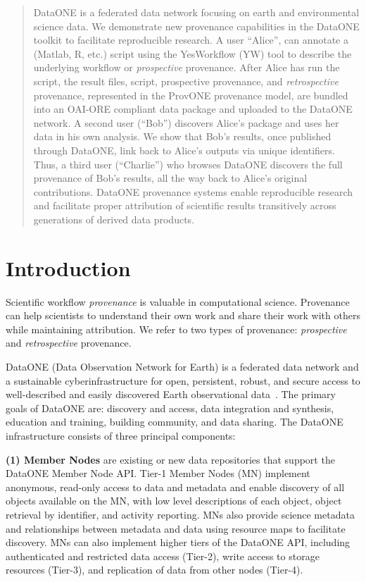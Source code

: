 \documentclass[a4paper]{llncs}
\newcommand{\mypara}[1]{\vspace{4pt}\noindent\textbf{#1}}
\begin{document}
\begin{abstract}
  DataONE is a federated data network focusing on earth and environmental science data.  We demonstrate new provenance capabilities in the DataONE toolkit to facilitate reproducible research. A user ``Alice'', can annotate a (Matlab, R, etc.) script using the YesWorkflow (YW) tool to describe the underlying workflow or \emph{prospective} provenance. After Alice has run the script, the result files, script, prospective provenance, and \emph{retrospective} provenance, represented in the ProvONE provenance model, are bundled into an OAI-ORE compliant data package and uploaded to the DataONE network. A second user (``Bob'') discovers Alice's package and uses her data in his own analysis. We show that Bob's results, once published through DataONE, link back to Alice's outputs via unique identifiers. Thus, a third user (``Charlie'') who browses DataONE discovers the full provenance of Bob's results, all the way back to Alice's original contributions.  DataONE provenance systems enable reproducible research and facilitate proper attribution of scientific results transitively across generations of derived data products.  \end{abstract}




\section{Introduction}

Scientific workflow \emph{provenance} is valuable in computational science. Provenance can help scientists to understand their own work and share their work with others while maintaining attribution. We refer to two types of provenance: \emph{prospective} and \emph{retrospective} provenance. 

DataONE (Data Observation Network for Earth) is a federated data network and a sustainable cyberinfrastructure for open, persistent, robust, and secure access to well-described and easily discovered Earth observational data~\cite{dataone}. The primary goals of DataONE are: discovery and access, data integration and synthesis, education and training, building community, and data sharing. The DataONE infrastructure consists of three principal components:


\mypara{(1) Member Nodes} are existing or new data repositories that support the DataONE Member Node API.  Tier-1 Member Nodes (MN) implement anonymous, read-only access to data and metadata and enable discovery of all objects available on the MN, with low level descriptions of each object, object retrieval by identifier, and activity reporting. MNs also provide science metadata and relationships between metadata and data using resource maps \cite{oaiore} to facilitate discovery.  MNs can also implement higher tiers of the DataONE API, including authenticated and restricted data access (Tier-2), write access to storage resources (Tier-3), and replication of data from other nodes (Tier-4).
\end{document}
